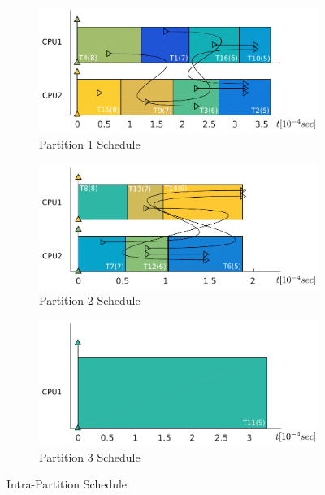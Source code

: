 \begin{figure}
  \begin{subfigure}{0.8\textwidth}
    \centering
    \includegraphics[width=1.0\textwidth]{intraP1}
    \caption{Partition 1 Schedule}
    \label{fig:intraP1}
  \end{subfigure}
  \begin{subfigure}{0.8\textwidth}
    \centering
    \includegraphics[width=1.0\textwidth]{intraP2}
    \caption{Partition 2 Schedule}
    \label{fig:intraP2}
  \end{subfigure}
  \begin{subfigure}{0.8\textwidth}
  \centering
    \includegraphics[width=1.0\textwidth]{intraP3}
    \caption{Partition 3 Schedule}
    \label{fig:intraP3}
  \end{subfigure}
  \caption{Intra-Partition Schedule}
  \label{fig:intra}
\end{figure}


